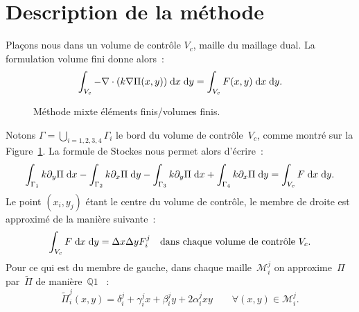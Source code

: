 \documentclass[main.tex]{subfiles}
\begin{document}
\section{Description de la méthode}
Plaçons nous dans un volume de contrôle $V_c$, maille du maillage dual.  La formulation volume fini donne alors~:
\begin{equation}
\int_{V_c} -\nabla\cdot ( k \nabla \Pi(x,y) ) \;{\rm d}x\;{\rm d}y = \int_{V_c}F(x,y) \;{\rm d}x\;{\rm d}y.
\end{equation}
\begin{figure}
\centering
\resizebox{.7\textwidth}{!}{}
\caption{\label{fig:methode_mixte_EFVF}Méthode mixte éléments finis/volumes finis.}
\end{figure}
Notons $\Gamma=\displaystyle \bigcup_{i=1,2,3,4} \Gamma_i$ le bord du volume de contrôle~$V_c$, comme montré sur la Figure~\ref{fig:methode_mixte_EFVF}. La formule de Stockes nous permet alors d'écrire~:
\begin{equation}
\int_{\Gamma_1}k \partial_y \Pi \;{\rm d}x - \int_{\Gamma_2}k \partial_x \Pi \;{\rm d}y - \int_{\Gamma_3}k \partial_y \Pi \;{\rm d}x + \int_{\Gamma_4}k \partial_x \Pi \;{\rm d}y = \int_{V_c}F \;{\rm d}x \;{\rm d}y.
\end{equation}
Le point $(x_i,y_j)$ étant le centre du volume de contrôle, le membre de droite est approximé de la manière suivante~:
\begin{equation}
\int_{V_c}F \;{\rm d}x \;{\rm d}y = \Delta x \Delta y F_i^j \quad \textrm{dans chaque volume de contrôle~} V_c.
\end{equation}
Pour ce qui est du membre de gauche, dans chaque maille~$\mathcal{M}_i^j$ on approxime~$\Pi$ par~$\tilde{\Pi}$ de manière~$\mathds{Q}1$ \ie~:
\begin{equation}\label{eq:anx_form_var_pr_eq_poisson}
\tilde{\Pi}_i^j(x,y) = \delta_i^j + \gamma_i^jx + \beta_i^jy + 2\alpha_i^jxy  \qquad \forall (x,y) \in \mathcal{M}_i^j.
\end{equation}
\end{document}

